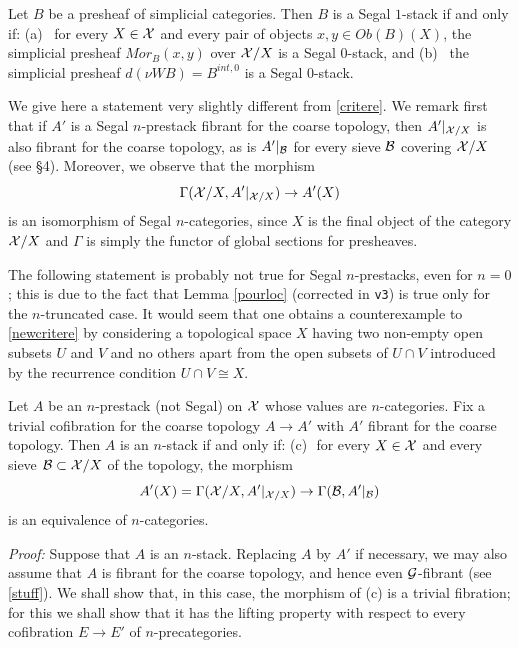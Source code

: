 \begin{corollary}
Let $B$ be a presheaf of simplicial categories. Then $B$ is a Segal $1$-stack
if and only if:
\newline
(a) \, for every $X\in {\cal X}$ and every pair of objects $x,y\in Ob (B)(X)$, the
simplicial presheaf $Mor_B(x,y)$ over ${\cal X} /X$ is a Segal $0$-stack, and
\newline (b) \, the simplicial presheaf
$d(\nu WB)= B^{int,0}$ is a Segal $0$-stack.
\end{corollary}
\eop







We give here a statement very slightly different from \ref{critere}.
We remark first that if $A'$ is a Segal $n$-prestack fibrant for the coarse
topology, then $A'|_{{\cal X} /X}$ is also fibrant for the coarse topology, as is
$A'|_{{\cal B}}$ for every sieve ${\cal B}$ covering ${\cal X} /X$ (see \S 4). Moreover, we
observe that the morphism
$$
\Gamma ({\cal X} /X , A'|_{{\cal X} /X}) \rightarrow A'(X)
$$
is an isomorphism of Segal $n$-categories, since $X$ is the final object of the
category ${\cal X} /X$ and $\Gamma$ is simply the functor of global sections for
presheaves.

The following statement is probably not true for Segal $n$-prestacks, even for
$n=0$; this is due to the fact that Lemma \ref{pourloc} (corrected in {\tt v3})
is true only for the $n$-truncated case. It would seem that one obtains a
counterexample to \ref{newcritere} by considering a topological space $X$
having two non-empty open subsets $U$ and $V$ and no others apart from the
open subsets of $U\cap V$ introduced by the recurrence condition
$U\cap V \cong X$.

\begin{proposition}
\label{newcritere}
Let $A$ be an $n$-prestack (not Segal) on ${\cal X}$ whose values are $n$-categories.
Fix a trivial cofibration for the coarse topology $A\rightarrow A'$ with $A'$
fibrant for the coarse topology.
Then $A$ is an $n$-stack if and only if:
\newline
(c)\,\,
for every $X\in {\cal X}$ and every sieve ${\cal B} \subset {\cal X} /X$ of the topology,
the morphism
$$
A'(X)=\Gamma ({\cal X} /X, A'|_{{\cal X} /X}) \rightarrow \Gamma ({\cal B} , A'|_{{\cal B}})
$$
is an equivalence of $n$-categories.
\end{proposition}
{\em Proof:}
Suppose that $A$ is an $n$-stack. Replacing $A$ by $A'$ if necessary, we may
also assume that $A$ is fibrant for the coarse topology, and hence even
${\cal G}$-fibrant (see \ref{stuff}). We shall show that, in this case, the morphism
of (c) is a trivial fibration; for this we shall show that it has the lifting
property with respect to every cofibration $E\rightarrow E'$ of $n$-precategories.

